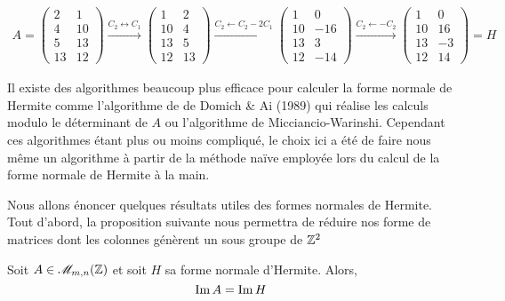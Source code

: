 \documentclass[11pt]{article}
\begin{document}
\begin{example}
	\begin{equation*}
		\begin{split}
			A =
			\begin{pmatrix}
				2  & 1  \\
				4  & 10 \\
				5  & 13 \\
				13 & 12
			\end{pmatrix}
			\overset{C_2 \leftrightarrow C_1}{\longrightarrow}
			\begin{pmatrix}
				1  & 2  \\
				10 & 4  \\
				13 & 5  \\
				12 & 13
			\end{pmatrix}
			\overset{C_2 \leftarrow C_2 - 2C_1}{\longrightarrow}
			\begin{pmatrix}
				1  & 0   \\
				10 & -16 \\
				13 & 3   \\
				12 & -14
			\end{pmatrix}
			\overset{C_2 \leftarrow - C_2}{\longrightarrow}
			\begin{pmatrix}
				1  & 0  \\
				10 & 16 \\
				13 & -3 \\
				12 & 14
			\end{pmatrix} = H
		\end{split}
	\end{equation*}

\end{example}
\begin{remark}
	Il existe des algorithmes beaucoup plus efficace pour calculer la forme normale de Hermite comme
	l'algorithme de de Domich \& Ai (1989) qui réalise les calculs modulo le déterminant de $A$ ou
	l'algorithme de Micciancio-Warinshi. Cependant ces algorithmes étant plus ou moins compliqué, le choix ici
	a été de faire nous même un algorithme à partir	de la méthode naïve employée lors du calcul de la forme normale de
	Hermite à la main.
\end{remark}
Nous allons énoncer quelques résultats utiles des formes normales de Hermite.
Tout d'abord, la proposition suivante nous permettra de réduire nos forme de matrices dont les colonnes
génèrent un sous groupe de $\mathbb Z^2$
\begin{proposition}
	Soit $A \in \mathscr{M}_{m,n}(\mathbb Z)$ et soit $H$ sa forme normale d'Hermite. Alors,
	$$\operatorname{Im} A = \operatorname{Im} H$$
\end{proposition}
\end{document}

